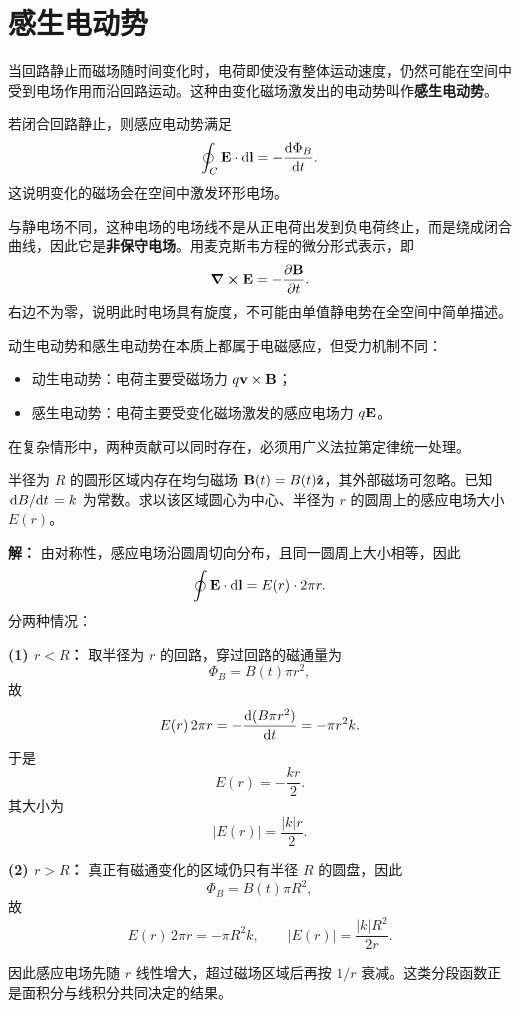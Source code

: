 \section{感生电动势}

当回路静止而磁场随时间变化时，电荷即使没有整体运动速度，仍然可能在空间中受到电场作用而沿回路运动。这种由变化磁场激发出的电动势叫作\textbf{感生电动势}。

\begin{law}[变化磁场产生电场]
若闭合回路静止，则感应电动势满足
\[
\oint_C \vb{E}\cdot \dd \vb{l}=-\dv{\Phi_B}{t}.
\]
这说明变化的磁场会在空间中激发环形电场。
\end{law}

与静电场不同，这种电场的电场线不是从正电荷出发到负电荷终止，而是绕成闭合曲线，因此它是\textbf{非保守电场}。用麦克斯韦方程的微分形式表示，即
\[
\curl \vb{E}=-\pdv{\vb{B}}{t}.
\]
右边不为零，说明此时电场具有旋度，不可能由单值静电势在全空间中简单描述。

\begin{remark}
动生电动势和感生电动势在本质上都属于电磁感应，但受力机制不同：
\begin{itemize}
  \item 动生电动势：电荷主要受磁场力 $q\vb{v}\times\vb{B}$；
  \item 感生电动势：电荷主要受变化磁场激发的感应电场力 $q\vb{E}$。
\end{itemize}
在复杂情形中，两种贡献可以同时存在，必须用广义法拉第定律统一处理。
\end{remark}

\begin{example}
半径为 $R$ 的圆形区域内存在均匀磁场 $\vb{B}(t)=B(t)\vu{z}$，其外部磁场可忽略。已知 $\dv*{B}{t}=k$ 为常数。求以该区域圆心为中心、半径为 $r$ 的圆周上的感应电场大小 $E(r)$。

\textbf{解：} 由对称性，感应电场沿圆周切向分布，且同一圆周上大小相等，因此
\[
\oint \vb{E}\cdot \dd \vb{l}=E(r)\cdot 2\pi r.
\]
分两种情况：

\textbf{(1) $r<R$：} 取半径为 $r$ 的回路，穿过回路的磁通量为
\[
\Phi_B=B(t)\pi r^2,
\]
故
\[
E(r)\,2\pi r=-\dv{(B\pi r^2)}{t}=-\pi r^2 k.
\]
于是
\[
E(r)=-\frac{k r}{2}.
\]
其大小为
\[
|E(r)|=\frac{|k|r}{2}.
\]

\textbf{(2) $r>R$：} 真正有磁通变化的区域仍只有半径 $R$ 的圆盘，因此
\[
\Phi_B=B(t)\pi R^2,
\]
故
\[
E(r)\,2\pi r=-\pi R^2 k,
\qquad
|E(r)|=\frac{|k|R^2}{2r}.
\]

因此感应电场先随 $r$ 线性增大，超过磁场区域后再按 $1/r$ 衰减。这类分段函数正是面积分与线积分共同决定的结果。
\end{example}

